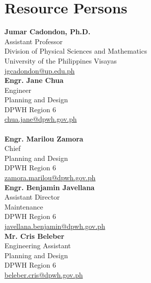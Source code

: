 %
%
%                 

\chapter{Resource Persons}
\label{sec:appendixb}

\newcommand{\resperson}[5]{%
	\textbf{#1} \\ %
	#2 \\          %
	#3 \\          %
	#4 \\          %
	\url{#5}       %
	\vspace{0.5em} \\
}

\resperson{Jumar Cadondon, Ph.D.}{Assistant Professor}{Division of Physical Sciences and Mathematics}{University of the Philippines Visayas}{jgcadondon@up.edu.ph}

\resperson{Engr. Jane Chua}{Engineer}{Planning and Design}{DPWH Region 6}{chua.jane@dpwh.gov.ph}\\

\resperson{Engr. Marilou Zamora}{Chief}{Planning and Design}{DPWH Region 6}{zamora.marilou@dpwh.gov.ph}

\resperson{Engr. Benjamin Javellana}{Assistant Director}{Maintenance}{DPWH Region 6}{javellana.benjamin@dpwh.gov.ph}

\resperson{Mr. Cris Beleber}{Engineering Assistant}{Planning and Design}{DPWH Region 6}{beleber.cris@dpwh.gov.ph}